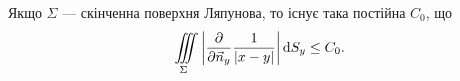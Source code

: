 \begin{theorem}
	\label{th:4.8.5}
	Якщо $\Sigma$ --- скінченна поверхня Ляпунова, то існує така постійна $C_0$, що
	\begin{equation}
		\label{eq:4.8.61}
		\displaystyle\iiint\limits_\Sigma \left| \frac{\partial}{\partial \vec n_y} \frac{1}{|x - y|} \right| \mathop{}\!\mathrm{d} S_y \le C_0.
	\end{equation}
\end{theorem}

